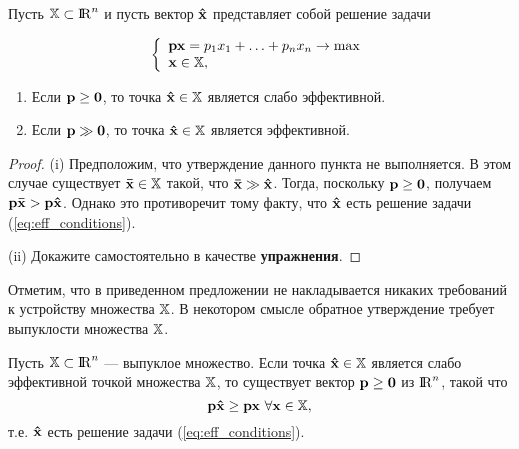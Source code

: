 \begin{prop}\label{vzvesh-summa}

Пусть $\mathbb{X} \subset {\rm I\!R}^n$ и пусть вектор $\mathbf{\hat x}$ представляет собой решение задачи

\begin{equation}\label{eq:eff_conditions}
\left\{ \begin{array}{l}
 \mathbf{p}\mathbf{x} = p_1x_1 + \ldots + p_n x_n\to \max  \\
 \mathbf{x} \in \mathbb{X}, \\
 \end{array} \right.
\end{equation}



\begin{enumerate}
\renewcommand{\theenumi}{(\roman{enumi})}
  \item Если $\mathbf{p} \geq \mathbf{0}$, то точка $\mathbf{\hat x} \in \mathbb{X}$ является
  слабо эффективной.
  \item Если $\mathbf{p} \gg \mathbf{0}$, то точка $\mathbf{\hat x} \in \mathbb{X}$ является
  эффективной.
\end{enumerate}

\end{prop}

\begin{proof}

(i) Предположим, что утверждение данного пункта не выполняется. В
этом случае существует $\mathbf{\bar x} \in \mathbb{X}$ такой, что $\mathbf{\bar
x} \gg \mathbf{\hat x}$. Тогда, поскольку $\mathbf{p} \geq \mathbf{0}$, получаем
$\mathbf{p}\mathbf{\bar x} > \mathbf{p}\mathbf{\hat x}$. Однако это противоречит
тому факту, что $\mathbf{\hat x}$ есть решение задачи
(\ref{eq:eff_conditions}).

(ii) Докажите самостоятельно в качестве \textbf{упражнения}.

\end{proof}



Отметим, что в приведенном предложении не накладывается никаких требований к устройству
множества $\mathbb{X}$. В некотором смысле обратное утверждение требует выпуклости множества
$\mathbb{X}$.



\begin{prop}\label{usl-eff}

Пусть $\mathbb{X} \subset {\rm I\!R}^n$ --- выпуклое множество. Если точка ${\mathbf{\hat x} \in \mathbb{X}}$
является слабо эффективной точкой множества $\mathbb{X}$, то существует вектор ${\mathbf{p} \geq
\mathbf{0}}$ из ${\rm I\!R}^n$, такой что
\[\mathbf{p}\mathbf{\hat x}\geq\mathbf{p}\mathbf{x} \ \forall \mathbf{x}\in\mathbb{X},\]
т.е. $\mathbf{\hat x}$ есть решение задачи (\ref{eq:eff_conditions}).
\end{prop}


